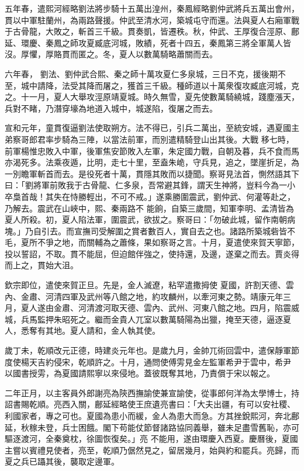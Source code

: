 \begin{pinyinscope}
 五年春，遣熙河經略劉法將步騎十五萬出湟州，秦鳳經略劉仲武將兵五萬出會州，貫以中軍駐蘭州，為兩路聲援。仲武至清水河，築城屯守而還。法與夏人右廂軍戰于古骨龍，大敗之，斬首三千級。貫奏凱，皆遷秩。秋，仲武、王厚復合涇原、鄜延、環慶、秦鳳之師攻夏臧底河城，敗績，死者十四五，秦鳳第三將全軍萬人皆沒。厚懼，厚賂貫而匿之。冬，夏人以數萬騎略蕭關而去。



 六年春，
 劉法、劉仲武合熙、秦之師十萬攻夏仁多泉城，三日不克，援後期不至，城中請降，法受其降而屠之，獲首三千級。種師道以十萬衆復攻臧底河城，克之。十一月，夏人大舉攻涇原靖夏城。時久無雪，夏先使數萬騎繞城，踐塵漲天，兵對不睹，乃潛穿壕為地道入城中，城遂陷，復屠之而去。



 宣和元年，童貫復逼劉法使取朔方。法不得已，引兵二萬出，至統安城，遇夏國主弟察哥郎君率步騎為三陣，以當法前軍，而別遣精騎登山出其後。大戰
 移七時，前軍楊惟忠敗入中軍，後軍焦安節敗入左軍，朱定國力戰，自朝及暮，兵不食而馬亦渴死多。法乘夜遁，比明，走七十里，至盍朱峗，守兵見，追之，墜崖折足，為一別瞻軍斬首而去。是役死者十萬，貫隱其敗而以捷聞。察哥見法首，惻然語其下曰：「劉將軍前敗我于古骨龍、仁多泉，吾常避其鋒，謂天生神將，豈料今為一小卒梟首哉！其失在恃勝輕出，不可不戒。」遂乘勝圍震武，劉仲武、何灌等赴之，乃解去。震武在山峽中，熙、秦兩路不
 能餉，自築三歲間，知軍李明、孟清皆為夏人所殺。初，夏人陷法軍，圍震武，欲拔之。察哥曰：「勿破此城，留作南朝病塊。」乃自引去。而宣撫司受解圍之賞者數百人，實自去之也。諸路所築城砦皆不毛，夏所不爭之地，而關輔為之蕭條，果如察哥之言。十月，夏遣使來賀天寧節，投以誓詔，不取。貫不能屈，但迫館伴強之，使持還，及邊，遂棄之而去。賈炎得而上之，貫始大沮。



 欽宗即位，遣使來賀正旦。先是，金人滅遼，粘罕遣撒拇使
 夏國，許割天德、雲內、金肅、河清四軍及武州等八館之地，約攻麟州，以牽河東之勢。靖康元年三月，夏人遂由金肅、河清渡河取天德、雲內、武州、河東八館之地。四月，陷震威城，兵馬監押朱昭死之。繼而金貴人兀室以數萬騎陽為出獵，掩至天德，逼逐夏人，悉奪有其地。夏人請和，金人執其使。



 歲丁未，乾順改元正德，時建炎元年也。是歲九月，金帥兀術回雲中，遣保靜軍節度使楊天吉約侵宋，乾順許之。十月，通問使傅雱見金左監軍希尹于雲中，希尹
 以國書授雱，為夏國請熙寧以來侵地。蓋彼既奪其地，乃責償于宋以報之。



 二年正月，以主客員外郎謝亮為陝西撫諭使兼宣諭使，從事郎何洋為太學博士，持詔書賜乾順。亮西入關，鄜延經略使王庶遺亮書曰：「大夫出疆，有可以安社稷、利國家者，專之可也。夏國為患小而緩，金人為患大而急。方其挫銳熙河，奔北鄜延，秋稼未登，兵士困餓。閣下苟能仗節督諸路協同義舉，雖未足盡雪舊恥，亦可驅逐渡河，全秦奠枕，徐圖恢復矣。」亮
 不能用，遂由環慶入西夏。慶曆後，夏國主嘗以賓禮見使者，亮至，乾順乃倨然見之，留居幾月，始與約和罷兵。亮歸，而夏之兵已躡其後，襲取定邊軍。




\end{pinyinscope}
